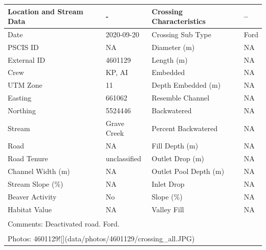 \documentclass[
]{book}
\begin{document}
\begin{tabular}{llll}
\toprule
Location and Stream Data & - & Crossing Characteristics & --\\
\midrule
Date & 2020-09-20 & Crossing Sub Type & Ford\\
PSCIS ID & NA & Diameter (m) & NA\\
External ID & 4601129 & Length (m) & NA\\
Crew & KP, AI & Embedded & NA\\
UTM Zone & 11 & Depth Embedded (m) & NA\\
\addlinespace
Easting & 661062 & Resemble Channel & NA\\
Northing & 5524446 & Backwatered & NA\\
Stream & Grave Creek & Percent Backwatered & NA\\
Road & NA & Fill Depth (m) & NA\\
Road Tenure & unclassified & Outlet Drop (m) & NA\\
\addlinespace
Channel Width (m) & NA & Outlet Pool Depth (m) & NA\\
Stream Slope (\%) & NA & Inlet Drop & NA\\
Beaver Activity & No & Slope (\%) & NA\\
Habitat Value & NA & Valley Fill & NA\\
\bottomrule
\multicolumn{4}{l}{\textsuperscript{} Comments: Deactivated road. Ford.}\\
\multicolumn{4}{l}{\textsuperscript{} Photos: 4601129![](data/photos/4601129/crossing\_all.JPG)}\\
\end{tabular}
\end{document}
